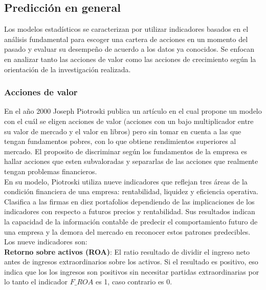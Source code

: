 \subsection{Predicci\'on en general}

Los modelos estadísticos se caracterizan por utilizar indicadores basados en el an\'alisis fundamental para escoger una cartera de acciones en un momento del pasado y evaluar su desempeño de acuerdo a los datos ya conocidos. Se enfocan en analizar tanto las acciones de valor como las acciones de crecimiento seg\'un la orientaci\'on de la investigaci\'on realizada. \\

\subsubsection{Acciones de valor}

En el año 2000 Joseph Piotroski publica un artículo \cite{Piotroski2000} en el cual propone un modelo con el cuál se eligen acciones de valor (acciones con un bajo multiplicador entre su valor de mercado y el valor en libros) pero sin tomar en cuenta a las que tengan fundamentos pobres, con lo que obtiene rendimientos superiores al mercado. El proposito de discriminar según los fundamentos de la empresa es hallar acciones que esten subvaloradas y separarlas de las acciones que realmente tengan problemas financieros.\\

En su modelo, Piotroski utiliza nueve indicadores que reflejan tres áreas de la condición financiera de una empresa: rentabilidad, liquidez y eficiencia operativa. Clasifica a las firmas en diez portafolios dependiendo de las implicaciones de los indicadores con respecto a futuros precios y rentabilidad. Sus resultados indican la capacidad de la información contable de predecir el comportamiento futuro de una empresa y la demora del mercado en reconocer estos patrones predecibles.\\

Los nueve indicadores son:\\

\textbf{Retorno sobre activos (ROA)}: El ratio resultado de dividir el ingreso neto antes de ingresos extraordinarios sobre los activos. Si el resultado es positivo, eso indica que los los ingresos son positivos sin necesitar partidas extraordinarias por lo tanto el indicador $F\_ROA$ es 1, caso contrario es 0.\\

